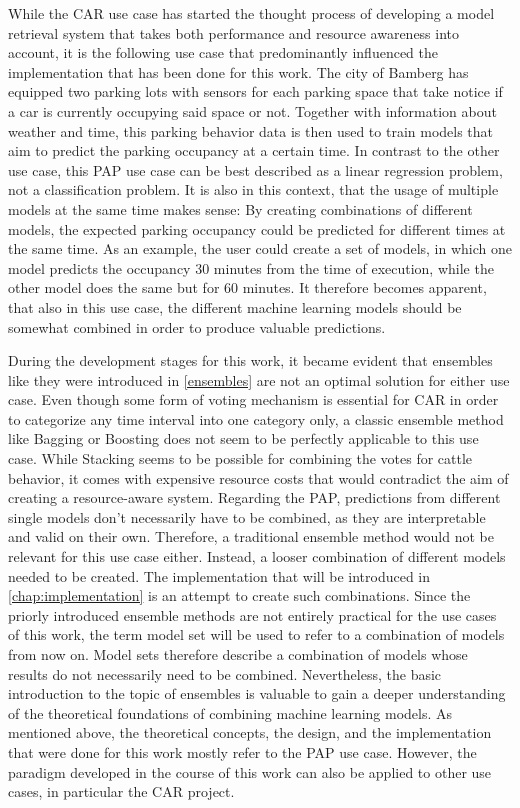 While the CAR use case has started the thought process of developing a model retrieval system that takes both performance and resource awareness into account, it is the following use case that predominantly influenced the implementation that has been done for this work. The city of Bamberg has equipped two parking lots with sensors for each parking space that take notice if a car is currently occupying said space or not. Together with information about weather and time, this parking behavior data is then used to train models that aim to predict the parking occupancy at a certain time. In contrast to the other use case, this PAP use case can be best described as a linear regression problem, not a classification problem. It is also in this context, that the usage of multiple models at the same time makes sense: By creating combinations of different models, the expected parking occupancy could be predicted for different times at the same time. As an example, the user could create a set of models, in which one model predicts the occupancy 30 minutes from the time of execution, while the other model does the same but for 60 minutes. It therefore becomes apparent, that also in this use case, the different machine learning models should be somewhat combined in order to produce valuable predictions. 

During the development stages for this work, it became evident that ensembles like they were introduced in \autoref{ensembles} are not an optimal solution for either use case. Even though some form of voting mechanism is essential for CAR in order to categorize any time interval into one category only, a classic ensemble method like Bagging or Boosting does not seem to be perfectly applicable to this use case. While Stacking seems to be possible for combining the votes for cattle behavior, it comes with expensive resource costs that would contradict the aim of creating a resource-aware system. Regarding the PAP, predictions from different single models don’t necessarily have to be combined, as they are interpretable and valid on their own. Therefore, a traditional ensemble method would not be relevant for this use case either. Instead, a looser combination of different models needed to be created. The implementation that will be introduced in \autoref{chap:implementation} is an attempt to create such combinations. Since the priorly introduced ensemble methods are not entirely practical for the use cases of this work, the term model set will be used to refer to a combination of models from now on. Model sets therefore describe a combination of models whose results do not necessarily need to be combined. Nevertheless, the basic introduction to the topic of ensembles is valuable to gain a deeper understanding of the theoretical foundations of combining machine learning models. As mentioned above, the theoretical concepts, the design, and the implementation that were done for this work mostly refer to the PAP use case. However, the paradigm developed in the course of this work can also be applied to other use cases, in particular the CAR project. 


